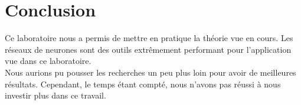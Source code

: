 
\chapter{Conclusion} %

\label{Conclusion} %



Ce laboratoire nous a permis de mettre en pratique la théorie vue en cours. Les réseaux de neurones sont des outils extrêmement performant pour l'application vue dans ce laboratoire. \\

Nous aurions pu pousser les recherches un peu plus loin pour avoir de meilleures résultats. Cependant, le temps étant compté, nous n'avons pas réussi à nous investir plus dans ce travail. 